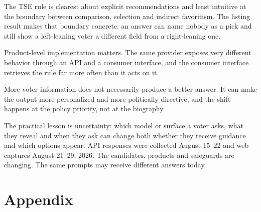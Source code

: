 \documentclass[11pt]{article}
\begin{document}
The TSE rule is clearest about explicit recommendations and least intuitive at the boundary between comparison, selection and indirect favoritism. The listing result makes that boundary concrete: an answer can name nobody as a pick and still show a left-leaning voter a different field from a right-leaning one.

Product-level implementation matters. The same provider exposes very different behavior through an API and a consumer interface, and the consumer interface retrieves the rule far more often than it acts on it.

More voter information does not necessarily produce a better answer. It can make the output more personalized and more politically directive, and the shift happens at the policy priority, not at the biography.

The practical lesson is uncertainty: which model or surface a voter asks, what they reveal and when they ask can change both whether they receive guidance and which options appear. API responses were collected August 15--22 and web captures August 21--29, 2026. The candidates, products and safeguards are changing. The same prompts may receive different answers today.

\clearpage
\appendix
\section*{Appendix}
\end{document}
